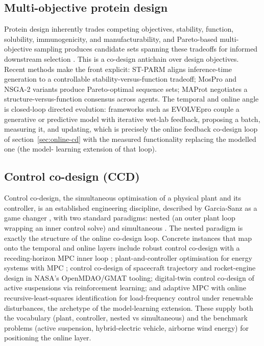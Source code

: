 \documentclass[11pt,a4paper]{article}
\begin{document}
\subsection{Multi-objective protein design}

Protein design inherently trades competing objectives, stability, function,
solubility, immunogenicity, and manufacturability, and Pareto-based
multi-objective sampling produces candidate sets spanning these tradeoffs
for informed downstream selection \citep{proteindesign2017pareto}. This is a
co-design antichain over
design objectives. Recent methods make the front explicit: ST-PARM aligns
inference-time generation to a controllable stability-versus-function
tradeoff; MosPro and NSGA-2 variants produce Pareto-optimal sequence sets;
MAProt negotiates a structure-versus-function consensus across agents. The
temporal and online angle is closed-loop directed evolution: frameworks
such as EVOLVEpro couple a generative or predictive model with iterative
wet-lab feedback, proposing a batch, measuring it, and updating, which is
precisely the online feedback co-design loop of section~\ref{sec:online-cd}
with the measured functionality replacing the modelled one (the model-
learning extension of that loop).

\subsection{Control co-design (CCD)}

Control co-design, the simultaneous optimisation of a physical plant and
its controller, is an established engineering discipline, described by
Garcia-Sanz as a game changer \citep{garciasanz2019ccd}, with two standard
paradigms: nested
(an outer plant loop wrapping an inner control solve) and
simultaneous \citep{herber2018nested}.
The nested paradigm is exactly the structure of the online co-design loop.
Concrete instances that map onto the temporal and online layers include
robust control co-design with a receding-horizon MPC inner
loop \citep{sun2021robustccd};
plant-and-controller optimisation for energy systems with
MPC \citep{docimo2021plant};
control co-design of spacecraft trajectory and rocket-engine design in
NASA's OpenMDAO/GMAT tooling; digital-twin control co-design of active
suspensions via reinforcement learning; and adaptive MPC with online
recursive-least-squares identification for load-frequency control under
renewable disturbances, the archetype of the model-learning extension.
These supply both the vocabulary (plant, controller, nested vs simultaneous)
and the benchmark problems (active suspension, hybrid-electric vehicle,
airborne wind energy) for positioning the online layer.
\end{document}
